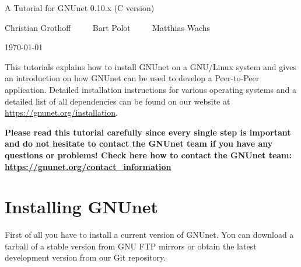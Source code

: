 \documentclass[10pt]{article}
\begin{document}


\begin{center}
\large {A Tutorial for GNUnet 0.10.x (C version)}

Christian Grothoff $\qquad$ Bart Polot $\qquad$ Matthias Wachs

\today
\end{center}
This tutorials explains how to install GNUnet on a GNU/Linux system and gives an introduction on how
GNUnet can be used to develop a Peer-to-Peer application. Detailed installation instructions for
various operating systems and a detailed list of all dependencies can be found on our website at
\url{https://gnunet.org/installation}.

\textbf{Please read this tutorial carefully since every single step is
  important and do not hesitate to contact the GNUnet team if you have
  any questions or problems! Check here how to contact the GNUnet
  team: \url{https://gnunet.org/contact_information}}


\section{Installing GNUnet}

First of all you have to install a current version of GNUnet. You can download a
tarball of a stable version from GNU FTP mirrors or obtain the latest development
version from our Git repository.
\end{document}
